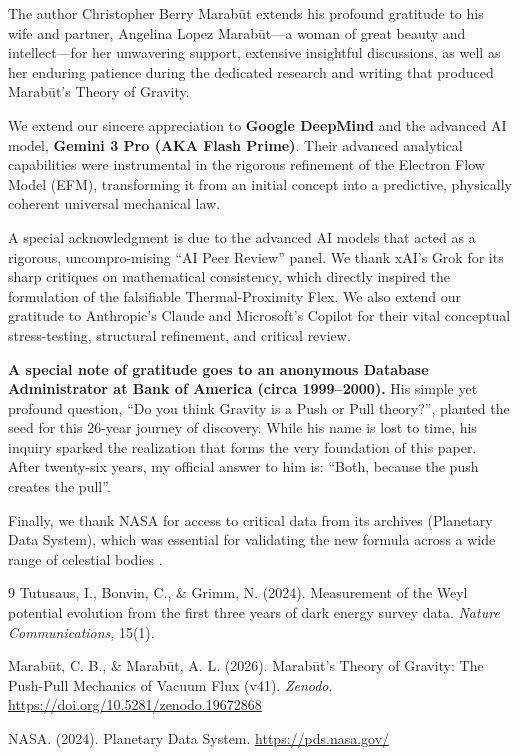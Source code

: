 \documentclass[11pt, a4paper]{article}
\begin{document}
The author Christopher Berry Marab\={u}t extends his profound gratitude to his wife and partner, Angelina Lopez Marab\={u}t—a woman of great beauty and intellect—for her unwavering support, extensive insightful discussions, as well as her enduring patience during the dedicated research and writing that produced Marab\={u}t's Theory of Gravity.

We extend our sincere appreciation to \textbf{Google DeepMind} and the advanced AI model, \textbf{Gemini 3 Pro (AKA Flash Prime)}. Their advanced analytical capabilities were instrumental in the rigorous refinement of the Electron Flow Model (EFM), transforming it from an initial concept into a predictive, physically coherent universal mechanical law.

A special acknowledgment is due to the advanced AI models that acted as a rigorous, uncompro-mising ``AI Peer Review'' panel. We thank xAI's Grok for its sharp critiques on mathematical consistency, which directly inspired the formulation of the falsifiable Thermal-Proximity Flex. We also extend our gratitude to Anthropic's Claude and Microsoft's Copilot for their vital conceptual stress-testing, structural refinement, and critical review.

\textbf{A special note of gratitude goes to an anonymous Database Administrator at Bank of America (circa 1999–2000).} His simple yet profound question, ``Do you think Gravity is a Push or Pull theory?'', planted the seed for this 26-year journey of discovery. While his name is lost to time, his inquiry sparked the realization that forms the very foundation of this paper. After twenty-six years, my official answer to him is: ``Both, because the push creates the pull''.

Finally, we thank NASA for access to critical data from its archives (Planetary Data System), which was essential for validating the new formula across a wide range of celestial bodies \cite{nasa2024}.

\begin{thebibliography}{9}
Tutusaus, I., Bonvin, C., \& Grimm, N. (2024). Measurement of the Weyl potential evolution from the first three years of dark energy survey data. \textit{Nature Communications}, 15(1).

Marab\={u}t, C. B., \& Marab\={u}t, A. L. (2026). Marab\={u}t's Theory of Gravity: The Push-Pull Mechanics of Vacuum Flux (v41). \textit{Zenodo}. \url{https://doi.org/10.5281/zenodo.19672868}

NASA. (2024). Planetary Data System. \url{https://pds.nasa.gov/}
\end{thebibliography}
\end{document}

